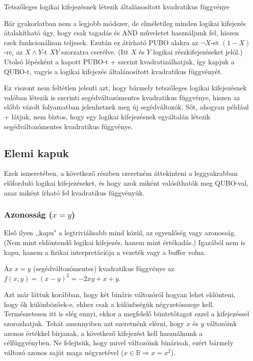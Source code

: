 \begin{allitas} \label{allitas:altkvadfunc}
	Tetszőleges logikai kifejezésnek létezik általánosított kvadratikus függvénye
	
	 Bár gyakorlatban nem a legjobb módszer, de elméletileg minden logikai kifejezés átalakítható úgy, hogy csak tagadás és AND műveletet használjunk fel, hiszen ezek funkcionálisan teljesek. Ezután ez átírható PUBO alakra az $\neg X$-et $(1-X)$-re, az $X \wedge Y$-t $XY$ szorzatra cserélve. (Itt $X$ és $Y$ logikai részkifejezéseket jelöl.) Utolsó lépésként a kapott PUBO-t \az+ szerint kvadratizálhatjuk, így kapjuk a QUBO-t, vagyis a logikai kifejezés általánosított kvadratikus függvényét.
\end{allitas}

 Ez viszont nem feltétlen jelenti azt, hogy bármely tetszőleges logikai kifejezésnek valóban létezik is  szerinti segédváltozómentes kvadratikus függvénye, hiszen az előbb vázolt folyamatban jelenhetnek meg új segédváltozók. Sőt, ahogyan például \az+ látjuk, nem biztos, hogy egy logikai kifejezésnek egyáltalán létezik segédváltozómentes kvadratikus függvénye.


\subsection{Elemi kapuk}\label{sec:theoryElementaryGates}

Ezek ismeretében, a következő részben szeretném áttekinteni a leggyakrabban előforduló logikai kifejezéseket, és hogy azok miként valósíthatók meg QUBO-val, azaz miként írható fel kvadratikus függvényük.

\subsubsection{Azonosság ($x=y$)}

Első ilyen ,,kapu" a legtriviálisabb mind közül, az egyenlőség vagy azonosság. (Nem mint eldöntendő logikai kifejezés, hanem mint értékadás.) Igazából nem is kapu, hanem a fizikai interpretációja a vezeték vagy a buffer volna. 

\begin{allitas}
	Az $x=y$ (segédváltozómentes) kvadratikus függvénye az $f(x,y)=(x-y)^2=-2xy+x+y$.
	
	Azt már láttuk korábban, hogy két bináris változóról hogyan lehet eldönteni, hogy ők különbözőek-e, ehhez csak a különbségük négyzetösszege kell. Természetesen itt is elég ennyi, ekkor a megfelelő büntetőtagot ezzel a kifejezéssel szorozhatjuk. Tehát amennyiben azt szeretnénk elérni, hogy $x$ és $y$ változóink azonos értékkel bírjanak, a következő kifejezést kell használnunk a célfüggvényben. Ne felejtsük, hogy mivel változóink binárisak, ezért bármely változó azonos saját maga négyzetével ($x \in \mathbb{B} \Rightarrow x = x^2$).	
\end{allitas}
	
